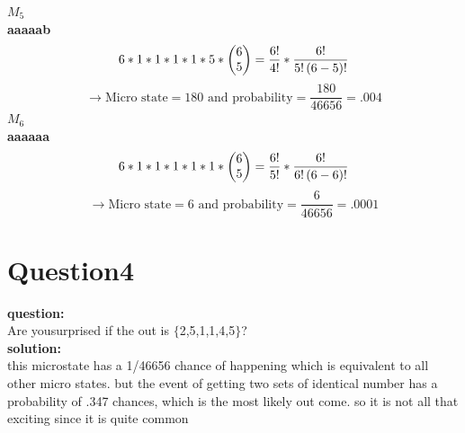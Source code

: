 \documentclass{article}
\begin{document}
\begin{flushleft}
\textbf{$M_5$}\\
\textbf{aaaaab}
\[ 6*1*1*1*1*5*\mqty(6\\5)=\frac{6!}{4!}*\frac{6!}{5!\left(6-5\right)!}\]
\[ \rightarrow \text{Micro state} = 180 \text{ and probability} = \frac{180}{46656}=.004\]
\textbf{$M_6$}\\
\textbf{aaaaaa}
\[ 6*1*1*1*1*1*\mqty(6\\5)=\frac{6!}{5!}*\frac{6!}{6!\left(6-6\right)!}\]
\[ \rightarrow \text{Micro state} = 6 \text{ and probability} = \frac{6}{46656}=.0001\]

\section{Question4}
\textbf{question:} \\
Are yousurprised if the out is $\{$2,5,1,1,4,5$\}$?\\
\textbf{solution:}\\
this microstate has a 1/46656  chance of happening which is equivalent to all other micro states. but the event of getting two sets of identical number has a probability of .347 chances, which is the most likely out come. so it is not all that exciting since it is quite common 

\end{flushleft}
\end{document}
